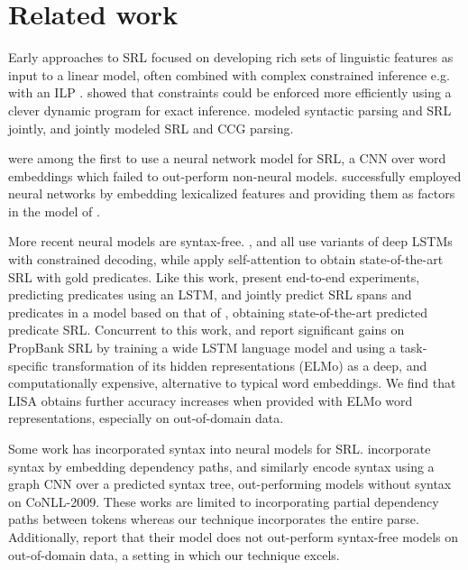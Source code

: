 \documentclass[11pt,a4paper]{article}
\begin{document}
\section{Related work}

Early approaches to SRL \citep{pradhan2005semantic,surdeanu2007combination,johansson2008dependency,toutanova2008global} focused on developing rich sets of linguistic features as input to a linear model, often combined with complex constrained inference e.g. with an ILP \citep{punyakanok2008importance}. \citet{tackstrom2015efficient} showed that constraints could be enforced more efficiently using a clever dynamic program for exact inference. 
\citet{sutton2005joint} modeled syntactic parsing and SRL jointly, and \citet{lewis2015joint} jointly modeled SRL and CCG parsing. 


\citet{collobert2011natural} were among the first to use a neural network model for SRL, a CNN over word embeddings which failed to out-perform non-neural models.
\citet{fitzgerald2015semantic} successfully employed neural networks by embedding lexicalized features and providing them as factors in the model of \citet{tackstrom2015efficient}.

More recent neural models are syntax-free. \citet{zhou2015end}, \citet{marcheggiani2017simple} and \citet{he2017deep} all use variants of deep LSTMs with constrained decoding, while \citet{tan2018deep} apply self-attention to obtain state-of-the-art SRL with gold predicates. Like this work, \citet{he2017deep} present end-to-end experiments, predicting predicates using an LSTM, and \citet{he2018jointly} jointly predict SRL spans and predicates in a model based on that of \citet{lee2017end}, obtaining state-of-the-art predicted predicate SRL. Concurrent to this work, \citet{peters2018deep} and \citet{he2018jointly} report significant gains on PropBank SRL by training a wide LSTM language model and using a task-specific transformation of its hidden representations (ELMo) as a deep, and computationally expensive, alternative to typical word embeddings. We find that LISA obtains further accuracy increases when provided with ELMo word representations, especially on out-of-domain data.


Some work has incorporated syntax into neural models for SRL. \citet{roth2016neural} incorporate syntax by embedding dependency paths, and similarly \citet{marcheggiani2017encoding} encode syntax using a graph CNN over a predicted syntax tree, out-performing models without syntax on CoNLL-2009. These works are limited to incorporating partial dependency paths between tokens whereas our technique incorporates the entire parse. Additionally, \citet{marcheggiani2017encoding} report that their model does not out-perform syntax-free models on out-of-domain data, a setting in which our technique excels.
\end{document}
